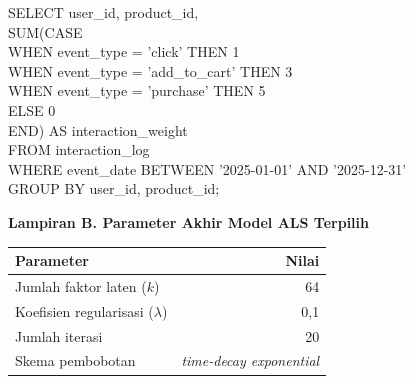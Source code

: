 \documentclass[12pt,a4paper]{report}
\begin{document}
\begin{tcolorbox}[
  colback=uinavy, colframe=uinavy, arc=1pt,
  left=8pt, right=8pt, top=6pt, bottom=6pt,
  fontupper=\footnotesize\ttfamily\color{white}
]
SELECT user\_id, product\_id,\\{}
\phantom{xx}SUM(CASE\\{}
\phantom{xxxx}WHEN event\_type = 'click' THEN 1\\{}
\phantom{xxxx}WHEN event\_type = 'add\_to\_cart' THEN 3\\{}
\phantom{xxxx}WHEN event\_type = 'purchase' THEN 5\\{}
\phantom{xxxx}ELSE 0\\{}
\phantom{xx}END) AS interaction\_weight\\{}
FROM interaction\_log\\{}
WHERE event\_date BETWEEN '2025-01-01' AND '2025-12-31'\\{}
GROUP BY user\_id, product\_id;
\end{tcolorbox}

\vspace{0.6cm}
\noindent
\textbf{Lampiran B. Parameter Akhir Model ALS Terpilih}

\begin{center}
\begin{tabularx}{0.7\textwidth}{@{}Xr@{}}
\toprule
\textbf{Parameter} & \textbf{Nilai} \\
\midrule
Jumlah faktor laten ($k$) & 64 \\
Koefisien regularisasi ($\lambda$) & 0,1 \\
Jumlah iterasi & 20 \\
Skema pembobotan & \emph{time-decay exponential} \\
\bottomrule
\end{tabularx}
\end{center}
\end{document}
